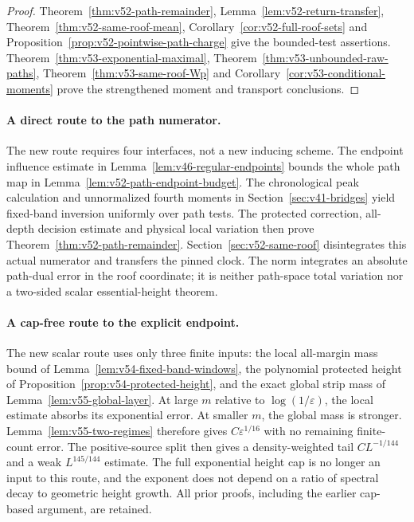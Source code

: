 \documentclass[11pt,reqno]{amsart}
\numberwithin{equation}{section}
\theoremstyle{definition}\newtheorem{definition}[theorem]{Definition}
\theoremstyle{remark}\newtheorem{remark}[theorem]{Remark}
\begin{document}
\begin{proof}
Theorem~\ref{thm:v52-path-remainder}, Lemma~\ref{lem:v52-return-transfer},
Theorem~\ref{thm:v52-same-roof-mean},
Corollary~\ref{cor:v52-full-roof-sets} and
Proposition~\ref{prop:v52-pointwise-path-charge} give the bounded-test
assertions. Theorem~\ref{thm:v53-exponential-maximal},
Theorem~\ref{thm:v53-unbounded-raw-paths},
Theorem~\ref{thm:v53-same-roof-Wp} and
Corollary~\ref{cor:v53-conditional-moments} prove the strengthened
moment and transport conclusions.
\end{proof}

\paragraph{A direct route to the path numerator.}
The new route requires four interfaces, not a new inducing scheme.
The endpoint influence estimate in
Lemma~\ref{lem:v46-regular-endpoints} bounds the whole path map in
Lemma~\ref{lem:v52-path-endpoint-budget}. The chronological peak
calculation and unnormalized fourth moments in
Section~\ref{sec:v41-bridges} yield fixed-band inversion uniformly over
path tests. The protected correction, all-depth decision estimate and
physical local variation then prove
Theorem~\ref{thm:v52-path-remainder}. Section~\ref{sec:v52-same-roof}
disintegrates this actual numerator and transfers the pinned clock.
The norm integrates an absolute path-dual error in the roof coordinate;
it is neither path-space total variation nor a two-sided scalar
essential-height theorem.

\paragraph{A cap-free route to the explicit endpoint.}
The new scalar route uses only three finite inputs: the local all-margin
mass bound of Lemma~\ref{lem:v54-fixed-band-windows}, the polynomial
protected height of Proposition~\ref{prop:v54-protected-height}, and
the exact global strip mass of Lemma~\ref{lem:v55-global-layer}.
At large $m$ relative to $\log(1/\varepsilon)$, the local estimate
absorbs its exponential error. At smaller $m$, the global mass is
stronger. Lemma~\ref{lem:v55-two-regimes} therefore gives
$C\varepsilon^{1/16}$ with no remaining finite-count error.
The positive-source split then gives a density-weighted tail
$CL^{-1/144}$ and a weak $L^{145/144}$ estimate. The full exponential
height cap is no longer an input to this route, and the exponent does
not depend on a ratio of spectral decay to geometric height growth.
All prior proofs, including the earlier cap-based argument, are retained.
\end{document}
